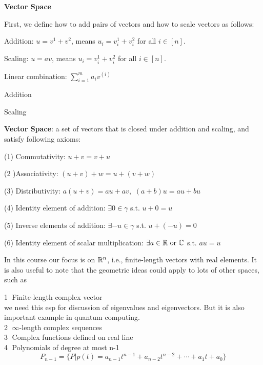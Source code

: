 \vspace{0.5cm}
\noindent\textbf{Vector Space}

First, we define how to add pairs of vectors and how to scale vectors as follows:

Addition: $u=v^{1}+v^{2}$, means $u_{i}=v_{i}^{1}+v_{i}^{2}$ for all $i\in [n]$.

Scaling: $u=av$,  means $u_{i}=v_{i}^{1}+v_{i}^{2}$ for all $i\in [n]$.

Linear combination: $\sum_{i=1}^{m} a_{i}v^{(i)}$

\begin{marginfigure}
	\centering
	\resizebox{7.5cm}{3cm}{}
	\caption{Addition}
	\label{fig.2-1}
\end{marginfigure}
\begin{marginfigure}
	\centering
	\resizebox{7.5cm}{3cm}{}
	\caption{Scaling}
	\label{fig.2-2}
\end{marginfigure}

\vspace{0.5cm}

\textbf{Vector Space}: a set of vectors that is closed under addition and scaling, and satisfy following axioms:

(1) Commutativity: $u+v=v+u$

(2 )Associativity: $(u+v)+w=u+(v+w)$

(3) Distributivity: $a(u+v)=au+av$,\ $(a+b)u=au+bu$

(4) Identity element of addition: $\exists 0\in \gamma$ s.t. $u+0=u$

(5) Inverse elements of addition: $\exists -u\in \gamma$ s.t. $u+(-u)=0$

(6) Identity element of scalar multiplication: $\exists a\in \mathbb{R}\ \text{or}\ \mathbb{C}$ s.t. $au=u$

\vspace{0.5cm}
In this course our focus is on $\mathbb{R}^{n}$, i.e., finite-length vectors with real elements. It is also useful to note that the geometric ideas could apply to lots of other spaces, such as

\textcircled{1} Finite-length complex vector\\
we need this esp for discussion of eigenvalues and eigenvectors. But it is also important example in quantum computing.\\
\textcircled{2} $\infty$-length complex sequences\\
\textcircled{3} Complex functions defined on real line\\
\textcircled{4} Polynomials of degree at most n-1\\
$$P_{n-1}=\{P|p(t)=a_{n-1}t^{n-1}+a_{n-2}t^{n-2}+\cdots + a_{1}t+a_{0} \}$$

